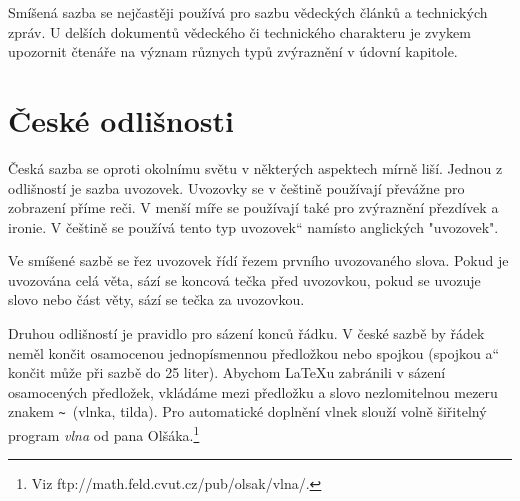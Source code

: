 \documentclass[a4paper, 11pt, twocolumn]{article}
\providecommand{\uv}[1]{\quotedblbase #1\textquotedblleft}
\begin{document}
Smíšená sazba se nejčastěji používá pro sazbu vědeckých článků a technických zpráv. U delších dokumentů vědeckého či technického charakteru je zvykem upozornit čtenáře na význam různych typů zvýraznění v údovní kapitole.

\section{České odlišnosti}
Česká sazba se oproti okolnímu světu v některých aspektech mírně liší. Jednou z odlišností je sazba uvozovek. Uvozovky se v češtině používají převážne pro zobrazení příme reči. V menší míře se používají také pro zvýraznění přezdívek a ironie. V češtině se používá tento \uv{typ uvozovek} namísto anglických "uvozovek".

Ve smíšené sazbě se řez uvozovek řídí řezem prvního uvozovaného slova. Pokud je uvozována celá věta, sází se koncová tečka před uvozovkou, pokud se uvozuje slovo nebo část věty, sází se tečka za uvozovkou.

Druhou odlišností je pravidlo pro sázení konců řádku. V české sazbě by řádek neměl končit osamocenou jednopísmennou předložkou nebo spojkou (spojkou \uv{a} končit může při sazbě do 25 liter). Abychom \LaTeX u zabránili v sázení osamocených předložek, vkládáme mezi předložku a slovo nezlomitelnou mezeru znakem \verb|~|\ (vlnka, tilda). Pro automatické doplnění vlnek slouží volně šiřitelný program \emph{vlna} od pana Olšáka.\footnote{Viz ftp://math.feld.cvut.cz/pub/olsak/vlna/.}
\end{document}
